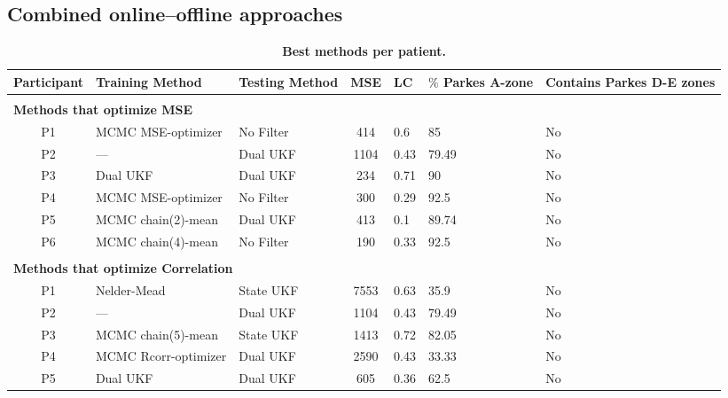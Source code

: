 \documentclass[10pt,letterpaper]{article}
\begin{document}
\subsection{Combined online--offline approaches}


\begin{table}[!ht]
\begin{adjustwidth}{-2.25in}{0in} %
\caption{{\bf Best methods per patient.}}
\label{table:bestPerPatient}
\begin{tabular}{|c|l|l|c|l|p{2cm}|p{2cm}|}
\hline
\textbf{Participant} & \textbf{Training Method} & \textbf{Testing Method} & \textbf{MSE} & \textbf{LC} & \textbf{$\%$ Parkes A-zone} & \textbf{Contains Parkes D-E zones} \\ 
\hline \hline
\multicolumn{7}{|l|}{}\\
\multicolumn{7}{|l|}{\textbf{Methods that optimize MSE}}\\
\hline
P1 & MCMC MSE-optimizer & No Filter & 414 & 0.6 & 85 & No \\
P2 & --- & Dual UKF & 1104 & 0.43 & 79.49 & No \\
P3 & Dual UKF & Dual UKF & 234 & 0.71 & 90 & No \\
P4 & MCMC MSE-optimizer & No Filter & 300 & 0.29 & 92.5 & No \\
P5 & MCMC chain(2)-mean & Dual UKF & 413 & 0.1 & 89.74 & No \\
P6 & MCMC chain(4)-mean & No Filter & 190 & 0.33 & 92.5 & No \\
\hline \hline
\multicolumn{7}{|l|}{}\\
\multicolumn{7}{|l|}{\textbf{Methods that optimize Correlation}}\\
\hline 
P1 & Nelder-Mead & State UKF & 7553 & 0.63 & 35.9 & No \\
P2 & --- & Dual UKF & 1104 & 0.43 & 79.49 & No \\
P3 & MCMC chain(5)-mean & State UKF & 1413 & 0.72 & 82.05 & No \\
P4 & MCMC Rcorr-optimizer & Dual UKF & 2590 & 0.43 & 33.33 & No \\
P5 & Dual UKF & Dual UKF & 605 & 0.36 & 62.5 & No \\

\end{tabular}
\end{adjustwidth}
\end{table}
\end{document}
